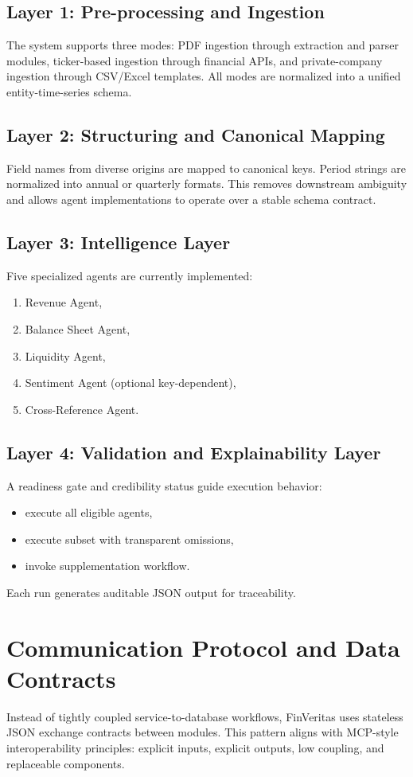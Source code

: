 \documentclass[conference]{IEEEtran}
\begin{document}
\subsection{Layer 1: Pre-processing and Ingestion}
The system supports three modes: PDF ingestion through extraction and parser modules, ticker-based ingestion through financial APIs, and private-company ingestion through CSV/Excel templates. All modes are normalized into a unified entity-time-series schema.

\subsection{Layer 2: Structuring and Canonical Mapping}
Field names from diverse origins are mapped to canonical keys. Period strings are normalized into annual or quarterly formats. This removes downstream ambiguity and allows agent implementations to operate over a stable schema contract.

\subsection{Layer 3: Intelligence Layer}
Five specialized agents are currently implemented:
\begin{enumerate}
    \item Revenue Agent,
    \item Balance Sheet Agent,
    \item Liquidity Agent,
    \item Sentiment Agent (optional key-dependent),
    \item Cross-Reference Agent.
\end{enumerate}

\subsection{Layer 4: Validation and Explainability Layer}
A readiness gate and credibility status guide execution behavior:
\begin{itemize}
    \item execute all eligible agents,
    \item execute subset with transparent omissions,
    \item invoke supplementation workflow.
\end{itemize}
Each run generates auditable JSON output for traceability.

\section{Communication Protocol and Data Contracts}
Instead of tightly coupled service-to-database workflows, FinVeritas uses stateless JSON exchange contracts between modules. This pattern aligns with MCP-style interoperability principles: explicit inputs, explicit outputs, low coupling, and replaceable components.
\end{document}
